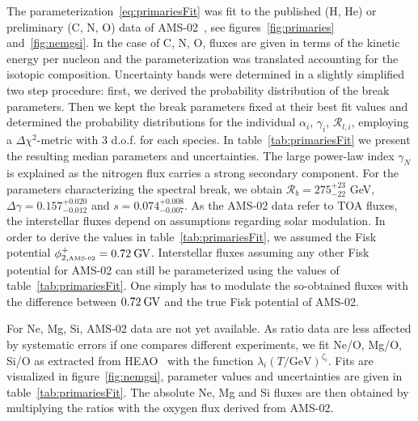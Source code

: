 \documentclass[a4paper,11pt]{article}
\newcommand{\eVdist}{\kern-0.06em}
\newcommand{\gv}{\:\text{G\eVdist V}}
\newcommand{\R}{\mathcal{R}}
\begin{document}
The parameterization~\eqref{eq:primariesFit} was fit to the published (H, He) or preliminary (C, N, O) data of AMS-02~\cite{Aguilar:2015ooa,Aguilar:2015ctt,talkXSCR}, see figures~\ref{fig:primaries} and~\ref{fig:nemgsi}. In the case of C, N, O, fluxes are given in terms of the kinetic energy per nucleon and the parameterization was translated accounting for the isotopic composition. Uncertainty bands were determined in a slightly simplified two step procedure: first, we derived the probability distribution of the break parameters. Then we kept the break parameters fixed at their best fit values and determined the probability distributions for the individual $\alpha_i$, $\gamma_i$, $\R_{l,i}$, employing a $\Delta\chi^2$-metric with 3 d.o.f. for each species. In table~\ref{tab:primariesFit} we present the resulting median parameters and uncertainties. The large power-law index $\gamma_N$ is explained as the nitrogen flux carries a strong secondary component. For the parameters characterizing the spectral break, we obtain $\R_b = 275^{+23}_{-22}$ GeV, $\Delta\gamma= 0.157^{+0.020}_{-0.012}$ and $s = 0.074^{+0.008}_{-0.007}$. As the AMS-02 data refer to TOA fluxes, the interstellar fluxes depend on assumptions regarding solar modulation. In order to derive the values in table~\ref{tab:primariesFit}, we assumed the Fisk potential $\phi^+_{2,\text{\tiny{AMS-02}}}=0.72\gv$. Interstellar fluxes assuming any other Fisk potential for AMS-02 can still be parameterized using the values of table~\ref{tab:primariesFit}. One simply has to modulate the so-obtained fluxes with the difference between $0.72\gv$ and the true Fisk potential of AMS-02.


For Ne, Mg, Si, AMS-02 data are not yet available. As ratio data are less affected by systematic errors if one compares different experiments, we fit Ne/O, Mg/O, Si/O as extracted from HEAO~\cite{Engelmann:1990} with the function $\lambda_i (T/\text{GeV})^{\zeta_i}$. Fits are visualized in figure~\ref{fig:nemgsi}, parameter values and uncertainties are given in table~\ref{tab:primariesFit}. The absolute Ne, Mg and Si fluxes are then obtained by multiplying the ratios with the oxygen flux derived from AMS-02.
\end{document}
